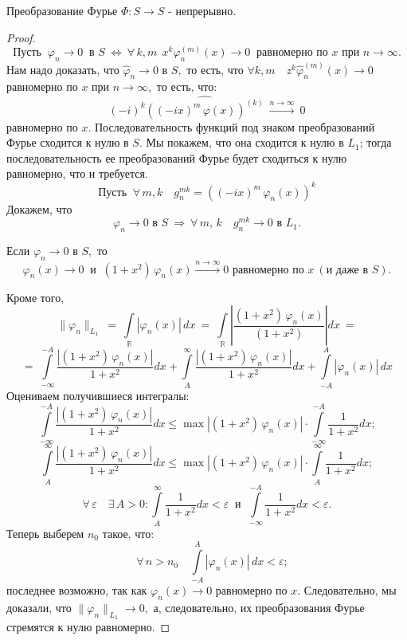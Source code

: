 \documentclass[a4paper]{article}
\newcommand{\nsb}{n\rightarrow \infty} %
\newcommand{\ff} {\varphi}
\newcommand{\il} {\int\limits_}
\newcommand{\w}{\widehat}
\newcommand{\wphi}{\widehat{\varphi}}
\begin{document}
\begin{theorem}
Преобразование Фурье $\Phi: S \rightarrow S$ - непрерывно.
\end{theorem}

\begin{proof}
$$
\mbox{Пусть }\ \varphi_n \rightarrow 0 \ \mbox{ в } S\
\Longleftrightarrow \ \forall \,k,m \ \  x^k \varphi_n^{(m)}(x)
\rightarrow 0 \ \mbox{ равномерно по $x$ при $\nsb$.}
$$
Нам надо доказать, что $\w{\ff}_n \rightarrow 0$ в $S,$ то есть,
что $\forall k,m \quad z^k \wphi ^{(m)}_n (x) \rightarrow 0$
равномерно по $x$ при $\nsb,$ то есть, что:
$$
(-i)^k \w{((-ix)^m \, \varphi (x))^{(k)}} \
\stackrel{\nsb}{\rightarrow} \ 0
$$
равномерно по $x$. Последовательность функций под знаком
преобразований Фурье сходится к нулю в $S$. Мы покажем, что она
сходится к нулю в $L_1$; тогда последовательность ее
преобразований Фурье будет сходиться к нулю равномерно, что и
требуется.
$$
\mbox{Пусть }\ \forall \, m,k \quad g_{n}^{mk} = ((-ix)^m \,
\varphi_n (x))^k
$$
Докажем, что
$$ \ff_n \rightarrow 0 \mbox{ в } S \ \Longrightarrow \ \forall \, m,\,k \quad g_{n}^{mk}
\rightarrow 0 \mbox{ в } L_1.$$

Если $\ff_n \rightarrow 0 \mbox{ в } S,$ то
$$\ff_n (x) \rightarrow 0 \ \mbox{ и }\ (1 + x^2) \, \ff_n (x)
\stackrel{\nsb}{\rightarrow} 0 \mbox{ равномерно по } x \ (\mbox{и
даже в } S).$$

Кроме того,
$$\|\ff_n\|_{L_1} \  =\  \int\limits_{\mathbb R} |\ff_n (x)| \, dx \ = \
\int\limits_{\mathbb R} \left| \frac{(1 + x^2) \, \ff_n (x)}{(1 +
x^2)} \right| dx \ =$$
$$
= \ \il{- \infty}^{-A} \frac{|(1 + x^2) \, \ff_n (x)|}{1 + x^2} dx
+ \il{A}^{\infty} \frac{|(1 + x^2) \, \ff_n (x)|}{1 + x^2} dx +
\il{-A}^{A} |\ff_n (x)|\, dx
$$
Оцениваем получившиеся интегралы:
$$
\il{- \infty}^{-A} \frac{|(1 + x^2) \, \ff_n (x)|}{1 + x^2} dx
\leqslant \max |(1 + x^2) \, \ff_n (x)| \cdot \il{-\infty}^{-A}
\frac{1}{1 + x^2} dx;
$$
$$
\il{A}^{\infty} \frac{|(1 + x^2) \, \ff_n (x)|}{1 + x^2} dx
\leqslant \max |(1 + x^2) \, \ff_n (x)| \cdot \il{A}^{\infty}
\frac{1}{1 + x^2} dx;
$$
$$
\forall \, \varepsilon \quad \exists \, A>0\colon \il{A}^{\infty}
\frac{1}{1 + x^2} dx < \varepsilon \ \mbox{ и }\ \il{-\infty}^{-A}
\frac{1}{1 + x^2} dx < \varepsilon.
$$
Теперь выберем $n_0$ такое, что:
$$
\quad \forall \, n > n_0 \quad \il{-A}^{A} |\ff_n (x)| \, dx <
\varepsilon;
$$
последнее возможно, так как $\ff_n (x) \rightarrow 0$ равномерно
по $x.$ Следовательно, мы доказали, что $\|\ff_n\|_{\, L_1}
\rightarrow 0,$ а, следовательно, их преобразования Фурье
стремятся к нулю равномерно.
\end{proof}
\bigskip
\end{document}
